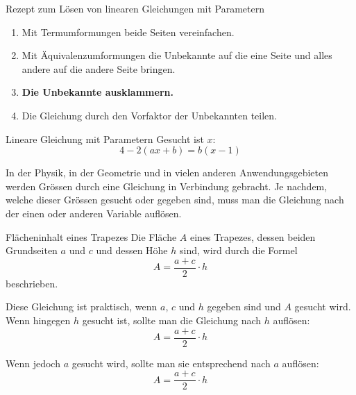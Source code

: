 \begin{satz}{Rezept zum Lösen von linearen Gleichungen mit Parametern}{}
    \begin{enumerate}
        \item Mit Termumformungen beide Seiten vereinfachen.
        \item Mit Äquivalenzumformungen die Unbekannte auf die eine Seite und alles andere auf die andere Seite bringen.
        \item \textbf{Die Unbekannte ausklammern.}
        \item Die Gleichung durch den Vorfaktor der Unbekannten teilen.
    \end{enumerate}
\end{satz}
\begin{bsp}{Lineare Gleichung mit Parametern}{}
    Gesucht ist \(x\):
    \[
        4-2(ax+b)=b(x-1)
    \]
    \vspace*{4cm}
\end{bsp}

In der Physik, in der Geometrie und in vielen anderen Anwendungsgebieten werden Grössen durch eine Gleichung in Verbindung gebracht. Je nachdem, welche dieser Grössen gesucht oder gegeben sind, muss man die Gleichung nach der einen oder anderen Variable auflösen.

\begin{bsp}{Flächeninhalt eines Trapezes}{}
    Die Fläche \(A\) eines Trapezes, dessen beiden Grundseiten \(a\) und \(c\) und dessen Höhe \(h\) sind, wird durch die Formel
    \[
        A=\frac{a+c}{2}\cdot h
    \]
    beschrieben.

    Diese Gleichung ist praktisch, wenn \(a\), \(c\) und \(h\) gegeben sind und \(A\) gesucht wird. Wenn hingegen \(h\) gesucht ist, sollte man die Gleichung nach \(h\) auflösen:
    \[
        A=\frac{a+c}{2}\cdot h
    \]

    \clearpage

    Wenn jedoch \(a\) gesucht wird, sollte man sie entsprechend nach \(a\) auflösen:
    \[
        A=\frac{a+c}{2}\cdot h
    \]

    \vspace{3cm}
\end{bsp}

